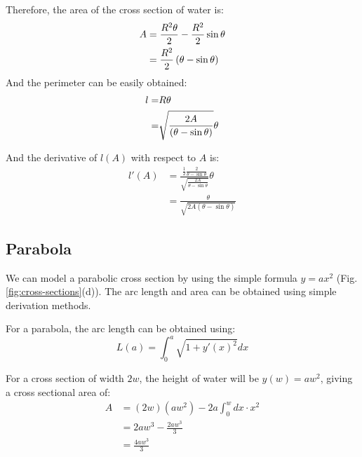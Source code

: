 \documentclass[12pt]{article}
\begin{document}
Therefore, the area of the cross section of water is:
\begin{align}
    A &=\frac{R^2 \theta}{2} - \frac{R^2}{2}\sin\theta \\
      &= \frac{R^2}{2}\left(\theta - \sin\theta\right) \notag
\end{align}
And the perimeter can be easily obtained:
\begin{align}
    l =& R\theta \\
        =& \sqrt{\frac{2A}{\left(\theta - \sin\theta\right)}}\theta \notag
\end{align}

And the derivative of $l(A)$ with respect to $A$ is:
\begin{equation}
    \begin{split}
         l'(A) &= \frac{\frac{1}{2}\frac{2}{\theta-\sin{\theta}}}{\sqrt{\frac{2A}{\theta-\sin{\theta}}}}\theta
        \\&= \frac{\theta}{\sqrt{2A(\theta-\sin{\theta})}}
    \end{split}
\end{equation}

\subsection{Parabola}
\label{appendix:parabola}
We can model a parabolic cross section by using the simple formula $y = ax^2$ (Fig. \ref{fig:cross-sections}(d)). The arc length and area can be obtained using simple derivation methods.

For a parabola, the arc length can be obtained using:
\begin{equation}
    L(a) = \int_0^a\sqrt{1 + y'(x)^2}dx
\end{equation}

For a cross section of width $2w$, the height of water will be $y(w) = aw^2$, giving a cross sectional area of:
\begin{equation}
    \begin{split}
        A &= (2w)(aw^2) - 2a\int_0^w dx \cdot x^2
        \\ &=2aw^3 - \frac{2aw^3}{3}
        \\ &=\frac{4aw^3}{3}
    \end{split}
\end{equation}
\end{document}
